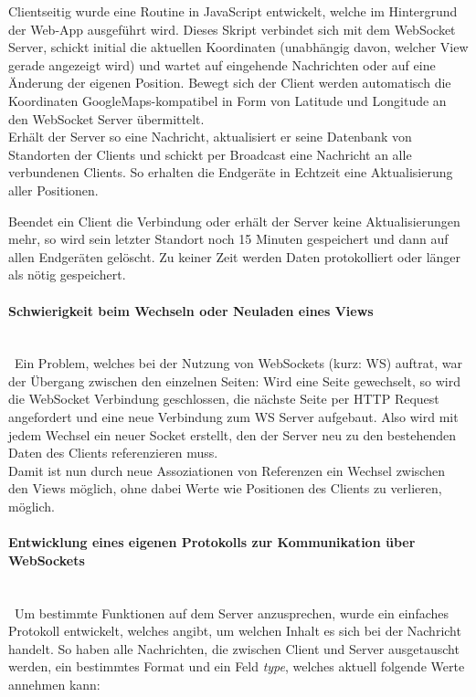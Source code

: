 Clientseitig wurde eine Routine in JavaScript entwickelt, welche im Hintergrund der Web-App ausgeführt wird. Dieses Skript verbindet sich mit dem WebSocket Server, schickt initial die aktuellen Koordinaten (unabhängig davon, welcher View gerade angezeigt wird) und wartet auf eingehende Nachrichten oder auf eine Änderung der eigenen Position. Bewegt sich der Client werden automatisch die Koordinaten GoogleMaps-kompatibel in Form von Latitude und Longitude an den WebSocket Server übermittelt.\\
Erhält der Server so eine Nachricht, aktualisiert er seine Datenbank von Standorten der Clients und schickt per Broadcast eine Nachricht an alle verbundenen Clients. So erhalten die Endgeräte in Echtzeit eine Aktualisierung aller Positionen.\par

Beendet ein Client die Verbindung oder erhält der Server keine Aktualisierungen mehr, so wird sein letzter Standort noch 15 Minuten gespeichert und dann auf allen Endgeräten gelöscht. Zu keiner Zeit werden Daten protokolliert oder länger als nötig gespeichert.\par

\paragraph{Schwierigkeit beim Wechseln oder Neuladen eines Views}\ \\ \
Ein Problem, welches bei der Nutzung von WebSockets (kurz: WS) auftrat, war der Übergang zwischen den einzelnen Seiten: Wird eine Seite gewechselt, so wird die WebSocket Verbindung geschlossen, die nächste Seite per HTTP Request angefordert und eine neue Verbindung zum WS Server aufgebaut. Also wird mit jedem Wechsel ein neuer Socket erstellt, den der Server neu zu den bestehenden Daten des Clients referenzieren muss.\\
Damit ist nun durch neue Assoziationen von Referenzen ein Wechsel zwischen den Views möglich, ohne dabei Werte wie Positionen des Clients zu verlieren, möglich.

\paragraph{Entwicklung eines eigenen Protokolls zur Kommunikation über WebSockets}\ \\ \
Um bestimmte Funktionen auf dem Server anzusprechen, wurde ein einfaches Protokoll entwickelt, welches angibt, um welchen Inhalt es sich bei der Nachricht handelt. So haben alle Nachrichten, die zwischen Client und Server ausgetauscht werden, ein bestimmtes Format und ein Feld \emph{type}, welches aktuell folgende Werte annehmen kann:

